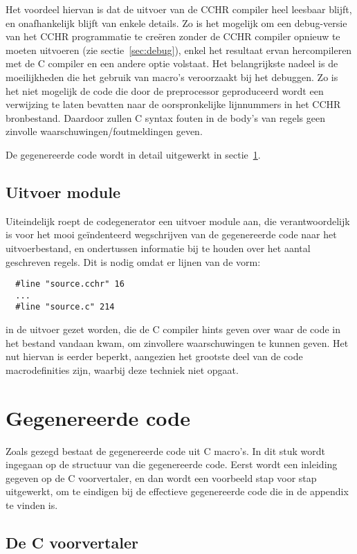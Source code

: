 Het voordeel hiervan is dat de uitvoer van de CCHR compiler heel leesbaar blijft, en onafhankelijk blijft van enkele details. Zo is het mogelijk om een debug-versie van het CCHR programmatie te cre\"eren zonder de CCHR compiler opnieuw te moeten uitvoeren (zie sectie~\ref{sec:debug}), enkel het resultaat ervan hercompileren met de C compiler en een andere optie volstaat. Het belangrijkste nadeel is de moeilijkheden die het gebruik van macro's veroorzaakt bij het debuggen. Zo is het niet mogelijk de code die door de preprocessor geproduceerd wordt een verwijzing te laten bevatten naar de oorspronkelijke lijnnummers in het CCHR bronbestand. Daardoor zullen C syntax fouten in de body's van regels geen zinvolle waarschuwingen/foutmeldingen geven.

De gegenereerde code wordt in detail uitgewerkt in sectie~\ref{sec:gencode}.

\subsection{Uitvoer module} \label{sec:uitvoer}

Uiteindelijk roept de codegenerator een uitvoer module aan, die verantwoordelijk is voor het mooi ge\"indenteerd wegschrijven van de gegenereerde code naar het uitvoerbestand, en ondertussen informatie bij te houden over het aantal geschreven regels. Dit is nodig omdat er lijnen van de vorm: \begin{Verbatim}
  #line "source.cchr" 16
  ...
  #line "source.c" 214
\end{Verbatim}
in de uitvoer gezet worden, die de C compiler hints geven over waar de code in het bestand vandaan kwam, om zinvollere waarschuwingen te kunnen geven. Het nut hiervan is eerder beperkt, aangezien het grootste deel van de code macrodefinities zijn, waarbij deze techniek niet opgaat.

\section{Gegenereerde code} \label{sec:gencode}

Zoals gezegd bestaat de gegenereerde code uit C macro's. In dit stuk wordt ingegaan op de structuur van die gegenereerde code. Eerst wordt een inleiding gegeven op de C voorvertaler, en dan wordt een voorbeeld stap voor stap uitgewerkt, om te eindigen bij de effectieve gegenereerde code die in de appendix te vinden is.

\subsection{De C voorvertaler} \label{sec:preproc}

